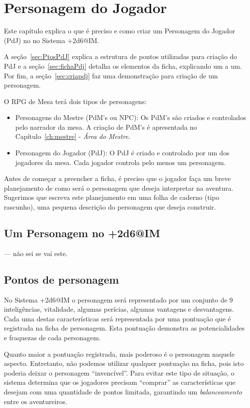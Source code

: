 \chapter{\label{ch:pdj}Personagem do Jogador}

Este capítulo explica o que é preciso e como criar um Personagem do Jogador (PdJ) no no Sistema +2d6@IM. 

A seção~\ref{sec:PtosPdJ} explica a estrutura de pontos utilizadas para criação do PdJ e a seção~\ref{sec:fichaPdj} detalha os elementos da ficha, explicando um a um. Por fim, a seção~\ref{sec:criapdj} faz uma demonstração para criação de um personagem.

O RPG de Mesa terá dois tipos de personagens: 
\begin{itemize}
	\item Personagens do Mestre (PdM's ou NPC): Os PdM's são criados e controlados pelo narrador da mesa. A criação de PdM's é apresentada no Capítulo~\ref{ch:mestre} - \emph{Área do Mestre}.
	
	\item Personagem do Jogador (PdJ): O PdJ é criado e controlado por um dos jogadores da mesa. Cada jogador controla pelo menos um personagem.
\end{itemize}

Antes de começar a preencher a ficha, é preciso que o jogador faça um breve planejamento de como será o personagem que deseja interpretar na aventura. Sugerimos que escreva este planejamento em uma folha de caderno (tipo rascunho), uma pequena descrição do personagem que deseja construir.

\section{\label{sec:pdj+2d6@IM}Um Personagem no +2d6@IM}
--- não sei se vai este.

\section{\label{sec:PtosPdJ}Pontos de personagem}
No Sistema +2d6@IM o personagem será representado por um conjunto de 9 inteligências, vitalidade, algumas perícias, algumas vantagens e desvantagens. Cada uma destas características será representada por uma pontuação que é registrada na ficha de personagem. Esta pontuação demonstra as potencialidades e fraquezas de cada personagem.

Quanto maior a pontuação registrada, mais poderoso é o personagem naquele aspecto. Entretanto, não podemos utilizar qualquer pontuação na ficha, pois isto poderia deixar o personagem ``invencível''. Para evitar este tipo de situação, o sistema determina que os jogadores precisam ``comprar'' as características que desejam com uma quantidade de pontos limitada, garantindo um \emph{balanceamento} entre os aventureiros. 

